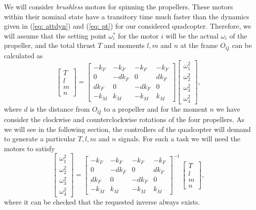 \documentclass[a4paper, onecolumn]{ieeeconf}
\begin{document}
We will consider \emph{brushless} motors for spinning the propellers. These motors within their nominal state have a transitory time much faster than the dynamics given in (\ref{eq: attdyn}) and (\ref{eq: pt}) for our considered quadcopter. Therefore, we will assume that the setting point $\omega_i^*$ for the motor $i$ will be the actual $\omega_i$ of the propeller, and the total thrust $T$ and moments $l, m$ and $n$ at the frame $O_Q$ can be calculated as
\begin{equation}
\begin{bmatrix}T \\ l \\ m \\ n\end{bmatrix} =
	\begin{bmatrix}
	-k_F & -k_F & -k_F & -k_F \\
		0 & -dk_F & 0 & dk_F \\
		dk_F & 0 & -dk_F & 0 \\
		-k_M & k_M & -k_M & k_M
	\end{bmatrix}
	\begin{bmatrix}\omega_1^2 \\ \omega_2^2 \\ \omega_3^2 \\ \omega_4^2
\end{bmatrix},
\end{equation}
where $d$ is the distance from $O_Q$ to a propeller and for the moment $n$ we have consider the clockwise and counterclockwise rotations of the four propellers. As we will see in the following section, the controllers of the quadcopter will demand to generate a particular $T, l, m$ and $n$ signals. For such a task we will need the motors to satisfy
\begin{equation}
	\begin{bmatrix}\omega_1^2 \\ \omega_2^2 \\ \omega_3^2 \\ \omega_4^2
\end{bmatrix}
=
	\begin{bmatrix}
	-k_F & -k_F & -k_F & -k_F \\
		0 & -dk_F & 0 & dk_F \\
		dk_F & 0 & -dk_F & 0 \\
		-k_M & k_M & -k_M & k_M
	\end{bmatrix}^{-1}\,
\begin{bmatrix}T \\ l \\ m \\ n\end{bmatrix},
	\label{eq: tlmn2w}
\end{equation}
where it can be checked that the requested inverse always exists.
\end{document}
